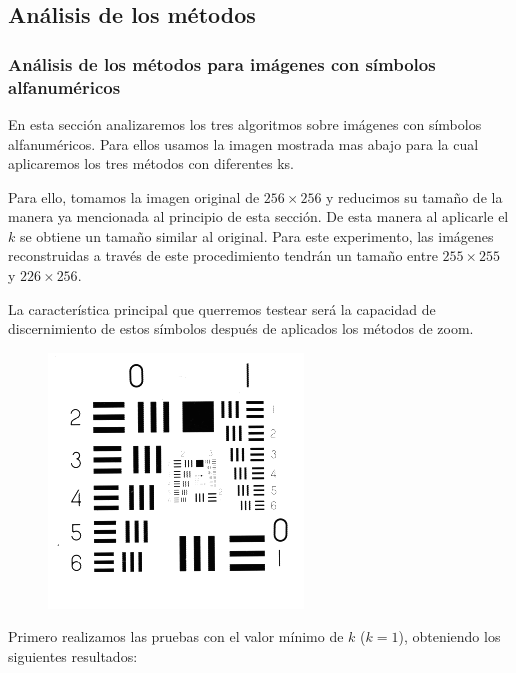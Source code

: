 \subsection{Análisis de los métodos}
\subsubsection{Análisis de los métodos para imágenes con símbolos alfanuméricos}
En esta sección analizaremos los tres algoritmos sobre imágenes con símbolos alfanuméricos. Para ellos usamos la imagen mostrada mas abajo para la cual aplicaremos los tres métodos con diferentes ks.

Para ello, tomamos la imagen original de $256 \times 256$ y reducimos su tamaño de la manera ya mencionada al principio de esta sección. De esta manera al aplicarle el $k$ se obtiene un tamaño similar al original. Para este experimento, las imágenes reconstruidas a través de este procedimiento tendrán un tamaño entre $255 \times 255$ y $226 \times 256$.

La característica principal que querremos testear será la capacidad de discernimiento de estos símbolos después de aplicados los métodos de zoom.

\begin{figure}[H]
\centering
\includegraphics[scale=0.50]{fotos/alfanum/orig.png}
\end{figure}

Primero realizamos las pruebas con el valor mínimo de $k$ ($k=1$), obteniendo los siguientes resultados:


